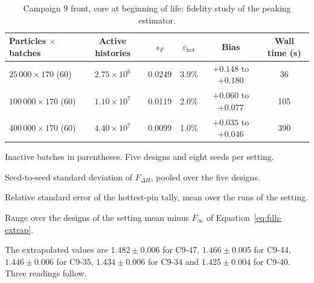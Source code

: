 \begin{table}[htbp]
  \centering
  \begin{threeparttable}
  \caption{Campaign 9 front, core at beginning of life: fidelity study of the peaking estimator.}
  \label{tab:fid-ladder-core}
  \small
  \setlength{\tabcolsep}{4pt}
  \begin{tabular}{@{}lccccc@{}}
    \toprule
    Particles $\times$ batches & Active histories & $s_F$\tnote{a} & $\varepsilon_\mathrm{hot}$\tnote{b} & Bias\tnote{c} & Wall time (s) \\
    \midrule
    $25\,000\times170$ (60)  & $2.75\times10^{6}$ & 0.0249 & 3.9\% & $+0.148$ to $+0.180$ & 36 \\
    $100\,000\times170$ (60) & $1.10\times10^{7}$ & 0.0119 & 2.0\% & $+0.060$ to $+0.077$ & 105 \\
    $400\,000\times170$ (60) & $4.40\times10^{7}$ & 0.0099 & 1.0\% & $+0.035$ to $+0.046$ & 390 \\
    \bottomrule
  \end{tabular}
  \begin{tablenotes}[flushleft]\footnotesize
    \item Inactive batches in parentheses. Five designs and eight seeds per setting.
    \item[a] Seed-to-seed standard deviation of $F_{\Delta H}$, pooled
      over the five designs.
    \item[b] Relative standard error of the hottest-pin tally, mean over
      the runs of the setting.
    \item[c] Range over the designs of the setting mean minus $F_\infty$ of
      Equation~\eqref{eq:fdh-extrap}.
  \end{tablenotes}
  \end{threeparttable}
\end{table}

The extrapolated values are $1.482 \pm 0.006$ for C9-47,
$1.466 \pm 0.005$ for C9-44, $1.446 \pm 0.006$ for C9-35,
$1.434 \pm 0.006$ for C9-34 and $1.425 \pm 0.004$ for C9-40. Three
readings follow.

